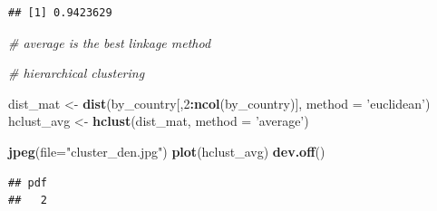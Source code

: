 \documentclass[]{article}
\newenvironment{Shaded}{\begin{snugshade}}{\end{snugshade}}
\newcommand{\CommentTok}[1]{\textcolor[rgb]{0.56,0.35,0.01}{\textit{#1}}}
\newcommand{\DataTypeTok}[1]{\textcolor[rgb]{0.13,0.29,0.53}{#1}}
\newcommand{\DecValTok}[1]{\textcolor[rgb]{0.00,0.00,0.81}{#1}}
\newcommand{\FloatTok}[1]{\textcolor[rgb]{0.00,0.00,0.81}{#1}}
\newcommand{\KeywordTok}[1]{\textcolor[rgb]{0.13,0.29,0.53}{\textbf{#1}}}
\newcommand{\NormalTok}[1]{#1}
\newcommand{\OperatorTok}[1]{\textcolor[rgb]{0.81,0.36,0.00}{\textbf{#1}}}
\newcommand{\StringTok}[1]{\textcolor[rgb]{0.31,0.60,0.02}{#1}}
\begin{document}
\begin{verbatim}
## [1] 0.9423629
\end{verbatim}

\begin{Shaded}
\begin{Highlighting}[]
\CommentTok{# average is the best linkage method}
\end{Highlighting}
\end{Shaded}

\begin{Shaded}
\end{Shaded}

\begin{Shaded}
\begin{Highlighting}[]
\CommentTok{# hierarchical clustering}

\NormalTok{dist_mat <-}\StringTok{ }\KeywordTok{dist}\NormalTok{(by_country[,}\DecValTok{2}\OperatorTok{:}\KeywordTok{ncol}\NormalTok{(by_country)], }\DataTypeTok{method =} \StringTok{'euclidean'}\NormalTok{)}
\NormalTok{hclust_avg <-}\StringTok{ }\KeywordTok{hclust}\NormalTok{(dist_mat, }\DataTypeTok{method =} \StringTok{'average'}\NormalTok{)}

\KeywordTok{jpeg}\NormalTok{(}\DataTypeTok{file=}\StringTok{"cluster_den.jpg"}\NormalTok{)}
\KeywordTok{plot}\NormalTok{(hclust_avg)}
\KeywordTok{dev.off}\NormalTok{()}
\end{Highlighting}
\end{Shaded}

\begin{verbatim}
## pdf 
##   2
\end{verbatim}
\end{document}
